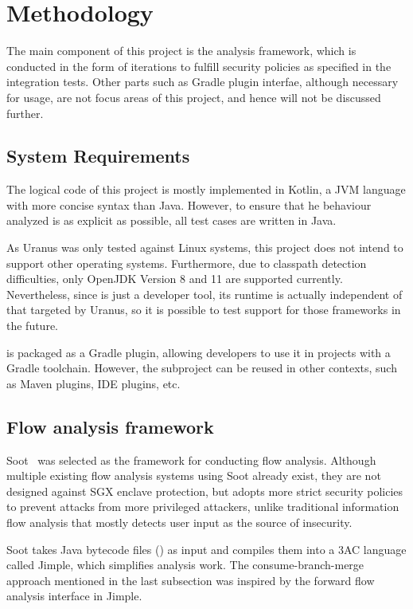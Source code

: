 \section{Methodology}\label{sec:methodology}
The main component of this project is the analysis framework,
which is conducted in the form of iterations
to fulfill security policies as specified in the integration tests.
Other parts such as Gradle plugin interfae,
although necessary for usage,
are not focus areas of this project, and hence will not be discussed further.



\subsection{System Requirements}\label{subsec:system-requirements}
The logical code of this project is mostly implemented in Kotlin,
a \ac{JVM} language with more concise syntax than Java.
However, to ensure that he behaviour analyzed
is as explicit as possible,
all test cases are written in Java.

As Uranus was only tested against Linux systems,
this project does not intend to support other operating systems.
Furthermore, due to classpath detection difficulties,
only OpenJDK Version 8 and 11 are supported currently.
Nevertheless, since \pname{} is just a developer tool,
its runtime is actually independent of that targeted by Uranus,
so it is possible to test support for those frameworks in the future.

\pname{} is packaged as a Gradle plugin,
allowing developers to use it in projects with a Gradle toolchain.
However, the  subproject can be reused in other contexts,
such as Maven plugins, IDE plugins, etc.

\subsection{Flow analysis framework}\label{subsec:flow-analysis-framework}
Soot~\cite{sootsurvivor} was selected as the framework for conducting flow analysis.
Although multiple existing flow analysis systems using Soot already exist,
they are not designed against \ac{SGX} enclave protection,
but \pname{} adopts more strict security policies
to prevent attacks from more privileged attackers,
unlike traditional information flow analysis
that mostly detects user input as the source of insecurity.

Soot takes Java bytecode files () as input
and compiles them into a \ac{3AC} language called Jimple,
which simplifies analysis work.
The consume-branch-merge approach mentioned in the last subsection
was inspired by the forward flow analysis interface in Jimple.

